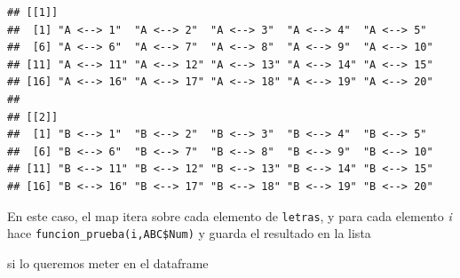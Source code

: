 \documentclass[]{book}
\newenvironment{Shaded}{\begin{snugshade}}{\end{snugshade}}
\newcommand{\DataTypeTok}[1]{\textcolor[rgb]{0.13,0.29,0.53}{#1}}
\newcommand{\DecValTok}[1]{\textcolor[rgb]{0.00,0.00,0.81}{#1}}
\newcommand{\KeywordTok}[1]{\textcolor[rgb]{0.13,0.29,0.53}{\textbf{#1}}}
\newcommand{\NormalTok}[1]{#1}
\newcommand{\OperatorTok}[1]{\textcolor[rgb]{0.81,0.36,0.00}{\textbf{#1}}}
\newcommand{\StringTok}[1]{\textcolor[rgb]{0.31,0.60,0.02}{#1}}
\begin{document}
\begin{verbatim}
## [[1]]
##  [1] "A <--> 1"  "A <--> 2"  "A <--> 3"  "A <--> 4"  "A <--> 5" 
##  [6] "A <--> 6"  "A <--> 7"  "A <--> 8"  "A <--> 9"  "A <--> 10"
## [11] "A <--> 11" "A <--> 12" "A <--> 13" "A <--> 14" "A <--> 15"
## [16] "A <--> 16" "A <--> 17" "A <--> 18" "A <--> 19" "A <--> 20"
## 
## [[2]]
##  [1] "B <--> 1"  "B <--> 2"  "B <--> 3"  "B <--> 4"  "B <--> 5" 
##  [6] "B <--> 6"  "B <--> 7"  "B <--> 8"  "B <--> 9"  "B <--> 10"
## [11] "B <--> 11" "B <--> 12" "B <--> 13" "B <--> 14" "B <--> 15"
## [16] "B <--> 16" "B <--> 17" "B <--> 18" "B <--> 19" "B <--> 20"
\end{verbatim}

En este caso, el map itera sobre cada elemento de \texttt{letras}, y para cada elemento \emph{i} hace
\texttt{funcion\_prueba(i,ABC\$Num)} y guarda el resultado en la lista

si lo queremos meter en el dataframe

\begin{Shaded}
\end{Shaded}
\end{document}

